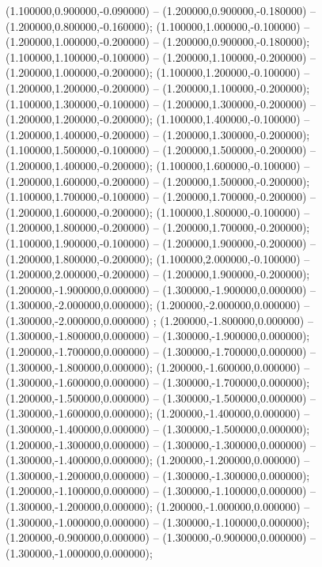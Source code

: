  (1.100000,0.900000,-0.090000) -- (1.200000,0.900000,-0.180000) -- (1.200000,0.800000,-0.160000);
 (1.100000,1.000000,-0.100000) -- (1.200000,1.000000,-0.200000) -- (1.200000,0.900000,-0.180000);
 (1.100000,1.100000,-0.100000) -- (1.200000,1.100000,-0.200000) -- (1.200000,1.000000,-0.200000);
 (1.100000,1.200000,-0.100000) -- (1.200000,1.200000,-0.200000) -- (1.200000,1.100000,-0.200000);
 (1.100000,1.300000,-0.100000) -- (1.200000,1.300000,-0.200000) -- (1.200000,1.200000,-0.200000);
 (1.100000,1.400000,-0.100000) -- (1.200000,1.400000,-0.200000) -- (1.200000,1.300000,-0.200000);
 (1.100000,1.500000,-0.100000) -- (1.200000,1.500000,-0.200000) -- (1.200000,1.400000,-0.200000);
 (1.100000,1.600000,-0.100000) -- (1.200000,1.600000,-0.200000) -- (1.200000,1.500000,-0.200000);
 (1.100000,1.700000,-0.100000) -- (1.200000,1.700000,-0.200000) -- (1.200000,1.600000,-0.200000);
 (1.100000,1.800000,-0.100000) -- (1.200000,1.800000,-0.200000) -- (1.200000,1.700000,-0.200000);
 (1.100000,1.900000,-0.100000) -- (1.200000,1.900000,-0.200000) -- (1.200000,1.800000,-0.200000);
 (1.100000,2.000000,-0.100000) -- (1.200000,2.000000,-0.200000) -- (1.200000,1.900000,-0.200000);
 (1.200000,-1.900000,0.000000) -- (1.300000,-1.900000,0.000000) -- (1.300000,-2.000000,0.000000);
 (1.200000,-2.000000,0.000000) -- (1.300000,-2.000000,0.000000) ;
 (1.200000,-1.800000,0.000000) -- (1.300000,-1.800000,0.000000) -- (1.300000,-1.900000,0.000000);
 (1.200000,-1.700000,0.000000) -- (1.300000,-1.700000,0.000000) -- (1.300000,-1.800000,0.000000);
 (1.200000,-1.600000,0.000000) -- (1.300000,-1.600000,0.000000) -- (1.300000,-1.700000,0.000000);
 (1.200000,-1.500000,0.000000) -- (1.300000,-1.500000,0.000000) -- (1.300000,-1.600000,0.000000);
 (1.200000,-1.400000,0.000000) -- (1.300000,-1.400000,0.000000) -- (1.300000,-1.500000,0.000000);
 (1.200000,-1.300000,0.000000) -- (1.300000,-1.300000,0.000000) -- (1.300000,-1.400000,0.000000);
 (1.200000,-1.200000,0.000000) -- (1.300000,-1.200000,0.000000) -- (1.300000,-1.300000,0.000000);
 (1.200000,-1.100000,0.000000) -- (1.300000,-1.100000,0.000000) -- (1.300000,-1.200000,0.000000);
 (1.200000,-1.000000,0.000000) -- (1.300000,-1.000000,0.000000) -- (1.300000,-1.100000,0.000000);
 (1.200000,-0.900000,0.000000) -- (1.300000,-0.900000,0.000000) -- (1.300000,-1.000000,0.000000);
